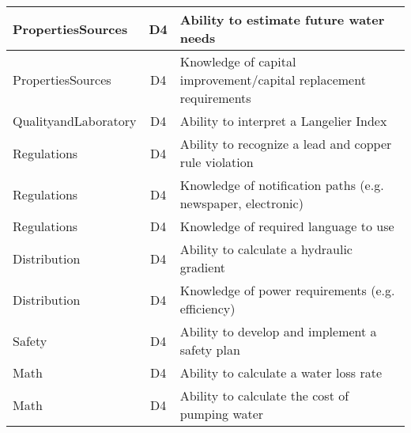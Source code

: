 \documentclass{article}
\begin{document}
\begin{table}[]
\begin{tabular}{|l|c|l|}
PropertiesSources                      & D4             & Ability to estimate future water needs                                                                                            \\ \hline
PropertiesSources                      & D4             & Knowledge of capital improvement/capital   replacement requirements                                                               \\ \hline
QualityandLaboratory                   & D4             & Ability to interpret a Langelier Index                                                                                            \\ \hline
Regulations                            & D4             & Ability to recognize a lead and copper rule   violation                                                                           \\ \hline
Regulations                            & D4             & Knowledge of notification paths (e.g.   newspaper, electronic)                                                                    \\ \hline
Regulations                            & D4             & Knowledge of required language to use                                                                                             \\ \hline
Distribution                           & D4             & Ability to calculate a hydraulic gradient                                                                                         \\ \hline
Distribution                           & D4             & Knowledge of power requirements (e.g.   efficiency)                                                                               \\ \hline
Safety                                 & D4             & Ability to develop and implement a safety   plan                                                                                  \\ \hline
Math                                   & D4             & Ability to calculate a water loss rate                                                                                            \\ \hline
Math                                   & D4             & Ability to calculate the cost of pumping   water                                                                                  \\ \hline

\end{tabular}
\end{table}
\end{document}
